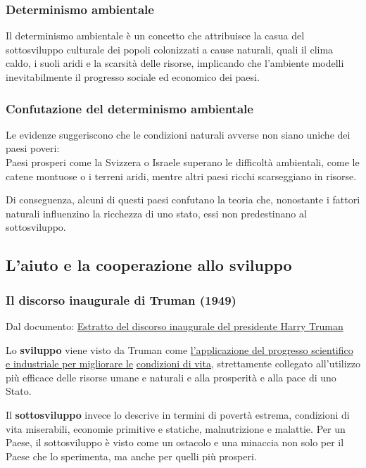 \documentclass{article}
\begin{document}
\subsubsection{Determinismo ambientale}
Il determinismo ambientale è un concetto che attribuisce la casua del sottosviluppo culturale
dei popoli colonizzati a cause naturali, quali il clima caldo, i suoli aridi e la scarsità
delle risorse, implicando che l'ambiente modelli inevitabilmente il progresso sociale ed
economico dei paesi.

\subsubsection{Confutazione del determinismo ambientale}
Le evidenze suggeriscono che le condizioni naturali avverse non siano uniche dei paesi poveri:\\
Paesi prosperi come la Svizzera o Israele superano le difficoltà ambientali, come le catene 
montuose o i terreni aridi, mentre altri paesi ricchi scarseggiano in risorse.

Di conseguenza, alcuni di questi paesi confutano la teoria che, nonostante i fattori naturali
influenzino la ricchezza di uno stato, essi non predestinano al sottosviluppo.

\subsection{L'aiuto e la cooperazione allo sviluppo}
\subsubsection{Il discorso inaugurale di Truman (1949)}
Dal documento: \href{https://github.com/matteofrongillo/passerella/blob/main/Geografia/media/011_Truman 1949 Sviluppo.pdf?raw=true}
{Estratto del discorso inaugurale del presidente Harry Truman}

Lo \textbf{sviluppo} viene visto da Truman come \underline{l'applicazione del progresso
scientifico e industriale per migliorare le} \underline{condizioni di vita}, strettamente 
collegato all'utilizzo più efficace delle risorse umane e naturali e alla prosperità e alla pace
di uno Stato.

Il \textbf{sottosviluppo} invece lo descrive in termini di povertà estrema, condizioni di vita
miserabili, economie primitive e statiche, malnutrizione e malattie. Per un Paese, il
sottosviluppo è visto come un ostacolo e una minaccia non solo per il Paese che lo sperimenta,
ma anche per quelli più prosperi.
\end{document}
